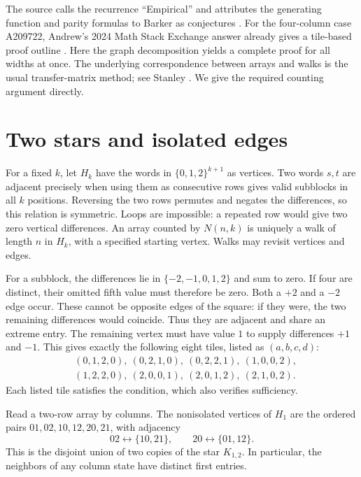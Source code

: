 \documentclass[11pt]{article}
\begin{document}
The source calls the recurrence ``Empirical'' and attributes the generating
function and parity formulas to Barker as conjectures \cite{a209723}.
For the four-column case A209722, Andrew's 2024 Math Stack Exchange answer
already gives a tile-based proof outline \cite{andrew}.
Here the graph decomposition yields a complete proof for all widths at once.
The underlying correspondence between arrays and walks is the usual
transfer-matrix method; see Stanley \cite[Section 4.7]{stanley}.
We give the required counting argument directly.

\section{Two stars and isolated edges}
For a fixed $k$, let $H_k$ have the words in $\{0,1,2\}^{k+1}$ as vertices.
Two words $s,t$ are adjacent precisely when using them as consecutive rows
gives valid subblocks in all $k$ positions. Reversing the two rows permutes
and negates the differences, so this relation is symmetric. Loops are
impossible: a repeated row would give two zero vertical differences.
An array counted by $N(n,k)$ is uniquely a walk of length $n$ in $H_k$,
with a specified starting vertex. Walks may revisit vertices and edges.

For a subblock, the differences lie in $\{-2,-1,0,1,2\}$ and sum to zero.
If four are distinct, their omitted fifth value must therefore be zero.
Both a $+2$ and a $-2$ edge occur. These cannot be opposite edges of the
square: if they were, the two remaining differences would coincide.
Thus they are adjacent and share an extreme entry. The remaining vertex
must have value $1$ to supply differences $+1$ and $-1$.
This gives exactly the following eight tiles, listed as $(a,b,c,d)$:
\begin{equation}\label{eq:tiles}
\begin{split}
 &(0,1,2,0),\ (0,2,1,0),\ (0,2,2,1),\ (1,0,0,2),\\
 &(1,2,2,0),\ (2,0,0,1),\ (2,0,1,2),\ (2,1,0,2).
\end{split}
\end{equation}
Each listed tile satisfies the condition, which also verifies sufficiency.

Read a two-row array by columns. The nonisolated vertices of $H_1$ are the
ordered pairs $01,02,10,12,20,21$, with adjacency
\begin{equation}\label{eq:stars}
 02\longleftrightarrow\{10,21\},\qquad
 20\longleftrightarrow\{01,12\}.
\end{equation}
This is the disjoint union of two copies of the star $K_{1,2}$.
In particular, the neighbors of any column state have distinct first entries.
\end{document}
